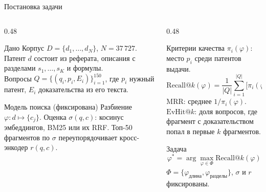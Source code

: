 \documentclass[aspectratio=169]{beamer}
\makeatletter
\newcommand{\Rk}[1]{\mathrm{Recall@}#1}
\makeatother
\begin{document}
\begin{frame}{Постановка задачи}
    \footnotesize
    \begin{columns}[T]
        \begin{column}{0.48\textwidth}
            \begin{block}{Дано}
                Корпус $D=\{d_1,\dots,d_N\}$, $N = 37\,727$. Патент $d$ состоит из реферата, описания с разделами $s_1,\dots,s_K$ и формулы.\\[3pt]
                Вопросы $Q = \{(q_i, p_i, E_i)\}_{i=1}^{150}$, где $p_i$ нужный патент, $E_i$ доказательства из его текста.
            \end{block}
            \begin{block}{Модель поиска (фиксирована)}
                Разбиение $\varphi: d \mapsto \{c_j\}$. Оценка $\sigma(q, c)$: косинус эмбеддингов, BM25 или их RRF.
                Топ-50 фрагментов по $\sigma$ переупорядочивает кросс-энкодер $r(q, c)$.
            \end{block}
        \end{column}
        \begin{column}{0.48\textwidth}
            \begin{block}{Критерии качества}
                $\pi_i(\varphi)$: место $p_i$ среди патентов выдачи.
                \[
                    \Rk{k}(\varphi) = \frac{1}{|Q|}\sum_{i=1}^{|Q|} \bigl[\pi_i(\varphi) \le k\bigr]
                \]
                MRR: среднее $1/\pi_i(\varphi)$.
                $\mathrm{EvHit@}k$: доля вопросов, где фрагмент с доказательством попал в первые $k$ фрагментов.
            \end{block}
            \begin{alertblock}{Задача}
                \[
                    \varphi^* = \arg\max_{\varphi \in \Phi} \Rk{k}(\varphi)
                \]
                $\Phi = \{\varphi_{\text{длина}}, \varphi_{\text{разделы}}\}$, $\sigma$ и $r$ фиксированы.
            \end{alertblock}
        \end{column}
    \end{columns}
\end{frame}
\end{document}
